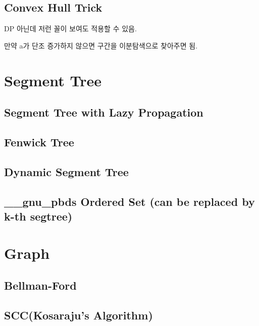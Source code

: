 \documentclass[10pt,landscape,a4paper,twocolumn]{article}
\begin{document}
\subsection{Convex Hull Trick}


DP 아닌데 저런 꼴이 보여도 적용할 수 있음.

만약 a가 단조 증가하지 않으면 구간을 이분탐색으로 찾아주면 됨.

\section{Segment Tree}

\subsection{Segment Tree with Lazy Propagation}


\subsection{Fenwick Tree}


\subsection{Dynamic Segment Tree}


\subsection{\_\_gnu\_pbds Ordered Set (can be replaced by k-th segtree)}


\section{Graph}

\subsection{Bellman-Ford}


\subsection{SCC(Kosaraju's Algorithm)}

\end{document}
